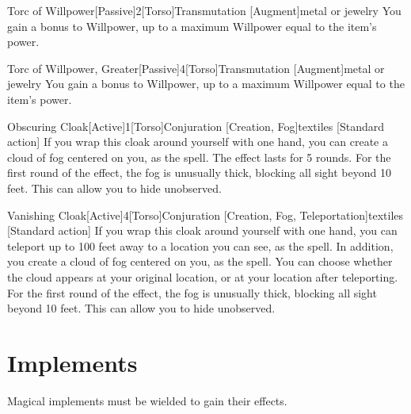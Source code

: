         \begin{magicitemdef}{Torc of Willpower}[Passive]{2}[Torso]{Transmutation [Augment]}{metal or jewelry}
             You gain a  bonus to Willpower, up to a maximum Willpower equal to the item's power.
        \end{magicitemdef}

        \begin{magicitemdef}{Torc of Willpower, Greater}[Passive]{4}[Torso]{Transmutation [Augment]}{metal or jewelry}
             You gain a  bonus to Willpower, up to a maximum Willpower equal to the item's power.
        \end{magicitemdef}

        \begin{magicitemdef}{Obscuring Cloak}[Active]{1}[Torso]{Conjuration [Creation, Fog]}{textiles}
            [Standard action] If you wrap this cloak around yourself with one hand, you can create a cloud of fog centered on you, as the  spell.
            The effect lasts for 5 rounds.
            For the first round of the effect, the fog is unusually thick, blocking all sight beyond 10 feet.
            This can allow you to hide unobserved.
        \end{magicitemdef}

        \begin{magicitemdef}{Vanishing Cloak}[Active]{4}[Torso]{Conjuration [Creation, Fog, Teleportation]}{textiles}
            [Standard action] If you wrap this cloak around yourself with one hand, you can teleport up to 100 feet away to a location you can see, as the  spell.
            In addition, you create a cloud of fog centered on you, as the  spell.
            You can choose whether the cloud appears at your original location, or at your location after teleporting.
            For the first round of the effect, the fog is unusually thick, blocking all sight beyond 10 feet.
            This can allow you to hide unobserved.
        \end{magicitemdef}

\section{Implements}
    Magical implements must be wielded to gain their effects.

